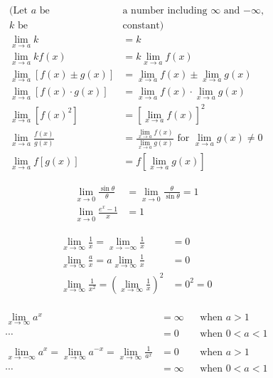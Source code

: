 \documentclass{article}
\begin{document}
\begin{multicols}{2}

\noindent\begin{align*}
	(\text{Let $a$ be } & \text{a number including $\infty$ and $-\infty$,} \\
	\text{$k$ be } & \text{constant}) \\
	\lim_{x \to a} k &= k \\
	\lim_{x \to a} kf(x) &= k\lim_{x \to a} f(x) \\
	\lim_{x \to a} [f(x) \pm g(x)] &= \lim_{x \to a} f(x) \pm \lim_{x \to a} g(x) \\
	\lim_{x \to a} [f(x) \cdot g(x)] &= \lim_{x \to a} f(x) \cdot \lim_{x \to a} g(x) \\
	\lim_{x \to a} [f(x)^2] &= [\lim_{x \to a} f(x)]^2 \\
	\lim_{x \to a} \frac{f(x)}{g(x)} &= \frac{\lim\limits_{x \to a} f(x)}{\lim\limits_{x \to a} g(x)} \text{ for $\lim_{x \to a} g(x) \neq 0$} \\
	\lim_{x \to a} f[g(x)] &= f[\lim_{x \to a} g(x)]
\end{align*}

\columnbreak

\begin{align*}
	\lim_{x \to 0} \frac{\sin \theta}{\theta} &= \lim_{x \to 0} \frac{\theta}{\sin \theta} = 1 \\
	\lim_{x \to 0} \frac{e^x - 1}{x} &= 1
\end{align*}

\begin{align*}
	\lim_{x \to \infty} \frac{1}{x} = \lim_{x \to -\infty} \frac{1}{x} &= 0 \\
	\lim_{x \to \infty} \frac{a}{x} = a\lim_{x \to \infty} \frac{1}{x} &= 0 \\
	\lim_{x \to \infty} \frac{1}{x^2} = (\lim_{x \to \infty} \frac{1}{x})^2 &= 0^2 = 0 \\
\end{align*}

\end{multicols}

\noindent\begin{align*}
	\lim_{x \to \infty} a^x &= \infty& &\text{when $a>1$} \\
	\cdots &= 0& &\text{when $0<a<1$} \\
	\\
	\lim_{x \to -\infty} a^x = \lim_{x \to \infty} a^{-x} = \lim_{x \to \infty} \frac{1}{a^x} &= 0& &\text{when $a>1$} \\
	\cdots &= \infty& &\text{when $0<a<1$}
\end{align*}
\end{document}
